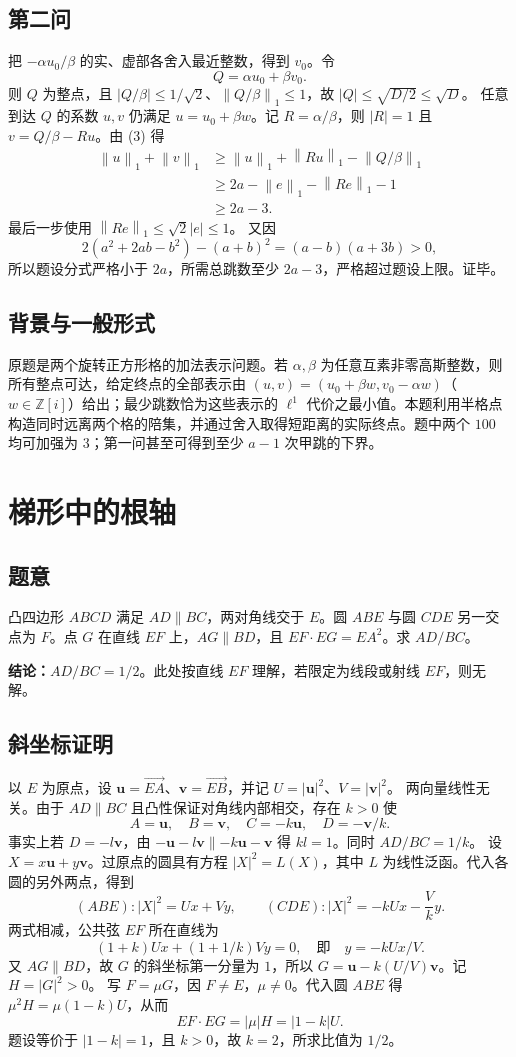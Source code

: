 \documentclass[UTF8,11pt,a4paper,fontset=fandol]{ctexart}
\newcommand{\Z}{\mathbb Z}
\newcommand{\norm}[1]{\left\lVert #1\right\rVert}
\newcommand{\ans}[1]{\par\noindent\textcolor{accent}{\textbf{结论：}}#1\par}
\begin{document}
\subsection*{第二问}
把 $-\alpha u_0/\beta$ 的实、虚部各舍入最近整数，得到 $v_0$。令
\[
Q=\alpha u_0+\beta v_0.
\]
则 $Q$ 为整点，且 $|Q/\beta|\le1/\sqrt2$、$\norm{Q/\beta}_1\le1$，故 $|Q|\le\sqrt{D/2}\le\sqrt D$。
任意到达 $Q$ 的系数 $u,v$ 仍满足 $u=u_0+\beta w$。记 $R=\alpha/\beta$，则 $|R|=1$ 且 $v=Q/\beta-Ru$。由 (3) 得
\[
\begin{aligned}
\norm{u}_1+\norm{v}_1
&\ge \norm{u}_1+\norm{Ru}_1-\norm{Q/\beta}_1\\
&\ge2a-\norm{e}_1-\norm{Re}_1-1\\
&\ge2a-3.
\end{aligned}
\]
最后一步使用 $\norm{Re}_1\le\sqrt2|e|\le1$。
又因
\[
2(a^2+2ab-b^2)-(a+b)^2
=(a-b)(a+3b)>0,
\]
所以题设分式严格小于 $2a$，所需总跳数至少 $2a-3$，严格超过题设上限。证毕。
\subsection*{背景与一般形式}
原题是两个旋转正方形格的加法表示问题。若 $\alpha,\beta$ 为任意互素非零高斯整数，则所有整点可达，给定终点的全部表示由
$(u,v)=(u_0+\beta w,v_0-\alpha w)$（$w\in\Z[i]$）给出；最少跳数恰为这些表示的 $\ell^1$ 代价之最小值。本题利用半格点构造同时远离两个格的陪集，并通过舍入取得短距离的实际终点。题中两个 $100$ 均可加强为 $3$；第一问甚至可得到至少 $a-1$ 次甲跳的下界。

\section{梯形中的根轴}
\subsection*{题意}
凸四边形 $ABCD$ 满足 $AD\parallel BC$，两对角线交于 $E$。圆 $ABE$ 与圆 $CDE$ 另一交点为 $F$。点 $G$ 在直线 $EF$ 上，$AG\parallel BD$，且 $EF\cdot EG=EA^2$。求 $AD/BC$。
\ans{$\displaystyle AD/BC=1/2$。此处按直线 $EF$ 理解，若限定为线段或射线 $EF$，则无解。}
\subsection*{斜坐标证明}
以 $E$ 为原点，设 $\mathbf u=\overrightarrow{EA}$、$\mathbf v=\overrightarrow{EB}$，并记 $U=|\mathbf u|^2$、$V=|\mathbf v|^2$。
两向量线性无关。由于 $AD\parallel BC$ 且凸性保证对角线内部相交，存在 $k>0$ 使
\[
A=\mathbf u,\quad B=\mathbf v,\quad
C=-k\mathbf u,\quad D=-\mathbf v/k.
\]
事实上若 $D=-l\mathbf v$，由 $-\mathbf u-l\mathbf v\parallel-k\mathbf u-\mathbf v$ 得 $kl=1$。同时 $AD/BC=1/k$。
设 $X=x\mathbf u+y\mathbf v$。过原点的圆具有方程 $|X|^2=L(X)$，其中 $L$ 为线性泛函。代入各圆的另外两点，得到
\[
(ABE): |X|^2=Ux+Vy,\qquad
(CDE): |X|^2=-kUx-\frac Vk y.
\]
两式相减，公共弦 $EF$ 所在直线为
\[
(1+k)Ux+(1+1/k)Vy=0,
\quad\text{即}\quad y=-kUx/V.
\]
又 $AG\parallel BD$，故 $G$ 的斜坐标第一分量为 $1$，所以
$G=\mathbf u-k(U/V)\mathbf v$。记 $H=|G|^2>0$。
写 $F=\mu G$，因 $F\ne E$，$\mu\ne0$。代入圆 $ABE$ 得
$\mu^2H=\mu(1-k)U$，从而
\[
EF\cdot EG=|\mu|H=|1-k|U.
\]
题设等价于 $|1-k|=1$，且 $k>0$，故 $k=2$，所求比值为 $1/2$。
\end{document}

